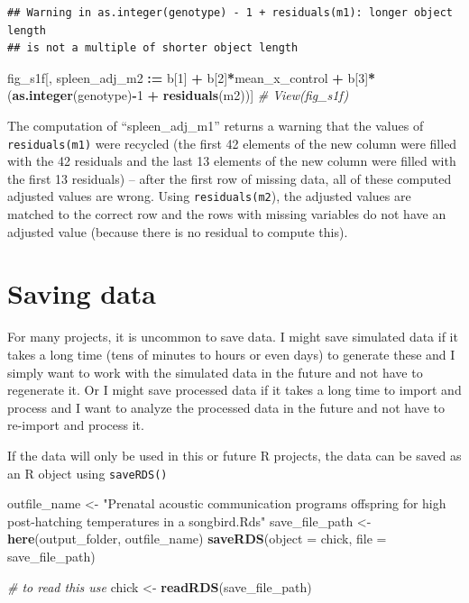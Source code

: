 \documentclass[]{book}
\newenvironment{Shaded}{\begin{snugshade}}{\end{snugshade}}
\newcommand{\CommentTok}[1]{\textcolor[rgb]{0.56,0.35,0.01}{\textit{#1}}}
\newcommand{\DataTypeTok}[1]{\textcolor[rgb]{0.13,0.29,0.53}{#1}}
\newcommand{\DecValTok}[1]{\textcolor[rgb]{0.00,0.00,0.81}{#1}}
\newcommand{\ErrorTok}[1]{\textcolor[rgb]{0.64,0.00,0.00}{\textbf{#1}}}
\newcommand{\KeywordTok}[1]{\textcolor[rgb]{0.13,0.29,0.53}{\textbf{#1}}}
\newcommand{\NormalTok}[1]{#1}
\newcommand{\OperatorTok}[1]{\textcolor[rgb]{0.81,0.36,0.00}{\textbf{#1}}}
\newcommand{\StringTok}[1]{\textcolor[rgb]{0.31,0.60,0.02}{#1}}
\begin{document}
\begin{verbatim}
## Warning in as.integer(genotype) - 1 + residuals(m1): longer object length
## is not a multiple of shorter object length
\end{verbatim}

\begin{Shaded}
\begin{Highlighting}[]
\NormalTok{fig_s1f[, spleen_adj_m2 }\OperatorTok{:}\ErrorTok{=}\StringTok{ }\NormalTok{b[}\DecValTok{1}\NormalTok{] }\OperatorTok{+}
\StringTok{          }\NormalTok{b[}\DecValTok{2}\NormalTok{]}\OperatorTok{*}\NormalTok{mean_x_control }\OperatorTok{+}
\StringTok{          }\NormalTok{b[}\DecValTok{3}\NormalTok{]}\OperatorTok{*}\NormalTok{(}\KeywordTok{as.integer}\NormalTok{(genotype)}\OperatorTok{-}\DecValTok{1} \OperatorTok{+}
\StringTok{          }\KeywordTok{residuals}\NormalTok{(m2))]}
\CommentTok{# View(fig_s1f)}
\end{Highlighting}
\end{Shaded}

The computation of ``spleen\_adj\_m1'' returns a warning that the values of \texttt{residuals(m1)} were recycled (the first 42 elements of the new column were filled with the 42 residuals and the last 13 elements of the new column were filled with the first 13 residuals) -- after the first row of missing data, all of these computed adjusted values are wrong. Using \texttt{residuals(m2}), the adjusted values are matched to the correct row and the rows with missing variables do not have an adjusted value (because there is no residual to compute this).

\hypertarget{saving-data}{%
\section{Saving data}\label{saving-data}}

For many projects, it is uncommon to save data. I might save simulated data if it takes a long time (tens of minutes to hours or even days) to generate these and I simply want to work with the simulated data in the future and not have to regenerate it. Or I might save processed data if it takes a long time to import and process and I want to analyze the processed data in the future and not have to re-import and process it.

If the data will only be used in this or future R projects, the data can be saved as an R object using \texttt{saveRDS()}

\begin{Shaded}
\begin{Highlighting}[]
\NormalTok{outfile_name <-}\StringTok{ "Prenatal acoustic communication programs offspring for high post-hatching temperatures in a songbird.Rds"}
\NormalTok{save_file_path <-}\StringTok{ }\KeywordTok{here}\NormalTok{(output_folder, outfile_name)}
\KeywordTok{saveRDS}\NormalTok{(}\DataTypeTok{object =}\NormalTok{ chick, }\DataTypeTok{file =}\NormalTok{ save_file_path)}

\CommentTok{# to read this use}
\NormalTok{chick <-}\StringTok{ }\KeywordTok{readRDS}\NormalTok{(save_file_path)}
\end{Highlighting}
\end{Shaded}
\end{document}
